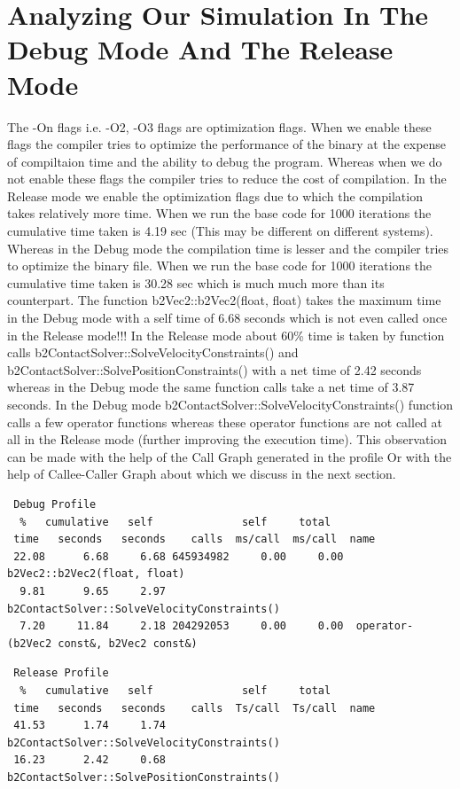 \documentclass[11pt]{article}
\begin{document}
\section{Analyzing Our Simulation In The Debug Mode And The Release Mode}
	The -On flags i.e. -O2, -O3 flags are optimization flags. When we enable these flags the compiler tries to optimize the performance of the binary at the expense of compiltaion time and the ability to debug the program. Whereas when we do not enable these flags the compiler tries to reduce the cost of compilation.\newline
	In the Release mode we enable the optimization flags due to which the compilation takes relatively more time. When we run the base code for 1000 iterations the cumulative time taken is 4.19 sec (This may be different on different systems). Whereas in the Debug mode the compilation time is lesser and the compiler tries to optimize the binary file. When we run the base code for 1000 iterations the cumulative time taken is 30.28 sec which is much much more than its counterpart.\newline
	The function b2Vec2::b2Vec2(float, float) takes the maximum time in the Debug mode with a self time of 6.68 seconds which is not even called once in the Release mode!!! \newline
	In the Release mode about 60\% time is taken by function calls b2ContactSolver::SolveVelocityConstraints() and b2ContactSolver::SolvePositionConstraints() with a net time of 2.42 seconds whereas in the Debug mode the same function calls take a net time of 3.87 seconds. In the Debug mode b2ContactSolver::SolveVelocityConstraints() function calls a few operator functions whereas these operator functions are not called at all in the Release mode (further improving the execution time). This observation can be made with the help of the Call Graph generated in the profile Or with the help of Callee-Caller Graph about which we discuss in the next section. 
\begin{verbatim}
 Debug Profile
  %   cumulative   self              self     total           
 time   seconds   seconds    calls  ms/call  ms/call  name    
 22.08      6.68     6.68 645934982     0.00     0.00  b2Vec2::b2Vec2(float, float)
  9.81      9.65     2.97                              b2ContactSolver::SolveVelocityConstraints()
  7.20     11.84     2.18 204292053     0.00     0.00  operator-(b2Vec2 const&, b2Vec2 const&)
\end{verbatim} 


\begin{verbatim}
 Release Profile
  %   cumulative   self              self     total           
 time   seconds   seconds    calls  Ts/call  Ts/call  name    
 41.53      1.74     1.74                             b2ContactSolver::SolveVelocityConstraints()
 16.23      2.42     0.68                             b2ContactSolver::SolvePositionConstraints()
\end{verbatim}
\end{document}
